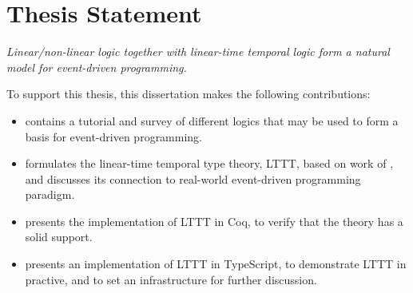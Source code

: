 \section{Thesis Statement}
\textit{Linear/non-linear logic together with linear-time temporal logic form a natural model for event-driven programming.}

To support this thesis, this dissertation makes the following contributions:

\begin{itemize}
    \item {} contains a tutorial and survey of different logics that may be used to form a basis for event-driven programming.
    \item {} formulates the linear-time temporal type theory, LTTT, based on work of \cite{Paykin2016TheEO}, and discusses its connection to real-world event-driven programming paradigm.
    \item {} presents the implementation of LTTT in Coq, to verify that the theory has a solid support.
    \item {} presents an implementation of LTTT in TypeScript, to demonstrate LTTT in practive, and to set an infrastructure for further discussion.
\end{itemize}